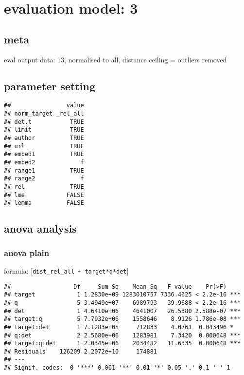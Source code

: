 \documentclass[
  12pt,
  oneside]{book}
\begin{document}
\section{evaluation model: 3}\label{evaluation-model-3}

\subsection{meta}\label{meta-2}

eval output data: 13, normalised to all, distance ceiling = outliers removed

\subsection{parameter setting}\label{parameter-setting-2}

\begin{verbatim}
##                value
## norm_target _rel_all
## det.t           TRUE
## limit           TRUE
## author          TRUE
## url             TRUE
## embed1          TRUE
## embed2             f
## range1          TRUE
## range2             f
## rel             TRUE
## lme            FALSE
## lemma          FALSE
\end{verbatim}

\subsection{anova analysis}\label{anova-analysis-2}

\subsubsection{anova plain}\label{anova-plain-2}

formula: {[}\texttt{dist\_rel\_all\ \textasciitilde{}\ target*q*det}{]}

\begin{verbatim}
##                  Df     Sum Sq    Mean Sq   F value    Pr(>F)    
## target            1 1.2830e+09 1283010757 7336.4625 < 2.2e-16 ***
## q                 5 3.4949e+07    6989793   39.9688 < 2.2e-16 ***
## det               1 4.6410e+06    4641007   26.5380 2.588e-07 ***
## target:q          5 7.7932e+06    1558646    8.9126 1.786e-08 ***
## target:det        1 7.1283e+05     712833    4.0761  0.043496 *  
## q:det             2 2.5680e+06    1283981    7.3420  0.000648 ***
## target:q:det      1 2.0345e+06    2034482   11.6335  0.000648 ***
## Residuals    126209 2.2072e+10     174881                        
## ---
## Signif. codes:  0 '***' 0.001 '**' 0.01 '*' 0.05 '.' 0.1 ' ' 1
\end{verbatim}
\end{document}
